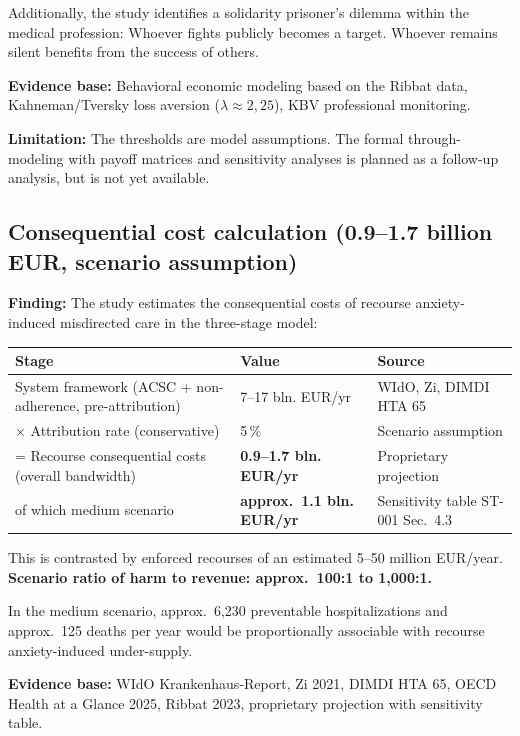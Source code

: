 \documentclass{umbruch-position}
\begin{document}
Additionally, the study identifies a solidarity prisoner's dilemma within the medical profession: Whoever fights publicly becomes a target. Whoever remains silent benefits from the success of others.

\textbf{Evidence base:} Behavioral economic modeling based on the Ribbat data, Kahneman/Tversky loss aversion ($\lambda \approx 2{,}25$), KBV professional monitoring.

\textbf{Limitation:} The thresholds are model assumptions. The formal through-modeling with payoff matrices and sensitivity analyses is planned as a follow-up analysis, but is not yet available.

\subsection{Consequential cost calculation (0.9--1.7 billion EUR, scenario assumption)}

\textbf{Finding:} The study estimates the consequential costs of recourse anxiety-induced misdirected care in the three-stage model:

\smallskip
{\small
\begin{tabularx}{\textwidth}{lXl}
\hline
\textbf{Stage} & \textbf{Value} & \textbf{Source} \\
\hline
System framework (ACSC + non-adherence, pre-attribution) & 7--17 bln. EUR/yr & WIdO, Zi, DIMDI HTA 65 \\
$\times$ Attribution rate (conservative) & 5\,\% & Scenario assumption \\
= Recourse consequential costs (overall bandwidth) & \textbf{0.9--1.7 bln. EUR/yr} & Proprietary projection \\
of which medium scenario & \textbf{approx.\ 1.1 bln. EUR/yr} & Sensitivity table ST-001 Sec.~4.3 \\
\hline
\end{tabularx}
}
\smallskip

This is contrasted by enforced recourses of an estimated 5--50 million EUR/year. \textbf{Scenario ratio of harm to revenue: approx.\ 100:1 to 1,000:1.}

In the medium scenario, approx.\ 6,230 preventable hospitalizations and approx.\ 125 deaths per year would be proportionally associable with recourse anxiety-induced under-supply.

\textbf{Evidence base:} WIdO Krankenhaus-Report, Zi 2021, DIMDI HTA 65, OECD Health at a Glance 2025, Ribbat 2023, proprietary projection with sensitivity table.
\end{document}
